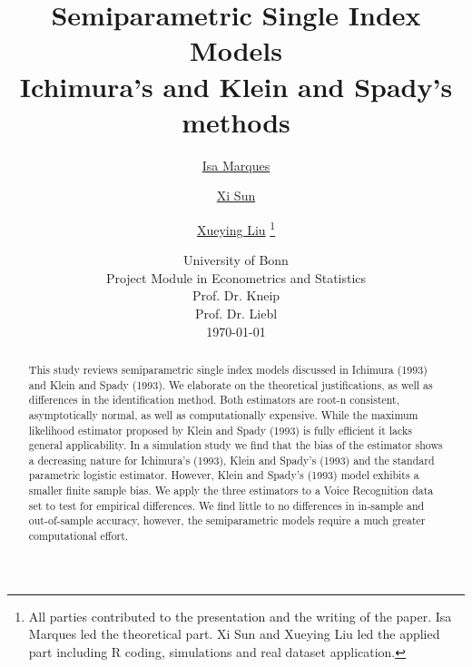 \documentclass[a4paper]{article}
\begin{document}
	\title{
	\vspace{1cm}
	\Huge \textbf{ Semiparametric Single Index Models }\\ \Large Ichimura's and Klein and Spady's methods \\
	}
	
	\vspace{1cm}
	
	
	\author{\Large \href{mailto:first.student@smail.fh-koeln.de}{Isa Marques}\and \Large \href{mailto:second.student@smail.fh-koeln.de}{Xi Sun} \and \Large \href{mailto:second.student@smail.fh-koeln.de}{Xueying Liu}
	\vspace{1cm} \thanks{All parties contributed to the presentation and the writing of the paper. Isa Marques led the theoretical part. Xi Sun and Xueying Liu led the applied part including R coding, simulations and real dataset application.}}
	
	\date{
	\large University of Bonn \\ Project Module in Econometrics and Statistics\\ 
	\vspace{0.8cm}
	\large Prof. Dr. Kneip \\
	\large Prof. Dr. Liebl \\
	\vspace{1cm}
	\today
	}

	\maketitle
	\setlength{\parindent}{0pt}

\vspace{1cm}
\begin{abstract}

This study reviews semiparametric single index models discussed in Ichimura (1993) and Klein and Spady (1993). We elaborate on the theoretical justifications, as well as differences in the identification method. Both estimators are root-n consistent, asymptotically normal, as well as computationally expensive. While the maximum likelihood estimator proposed by Klein and Spady (1993) is fully efficient it lacks general applicability. In a simulation study we find that the bias of the estimator shows a decreasing nature for Ichimura's (1993), Klein and Spady's (1993) and the standard parametric logistic estimator. However, Klein and Spady's (1993) model exhibits a smaller finite sample bias. We apply the three estimators to a Voice Recognition data set to test for empirical differences. We find little to no differences in in-sample and out-of-sample accuracy, however, the semiparametric models require a much greater computational effort.

\end{abstract}
\end{document}
